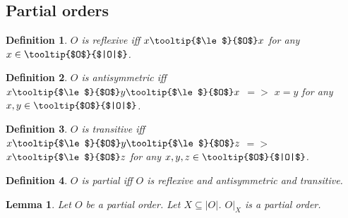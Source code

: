 \documentclass{article}
\newcommand{\rest}[2]{#1 \vert_{#2}}
\newcommand{\oO}[1]{\mbox{\tooltip{$\le$}{$#1$}}}
\newcommand{\oBC}[1]{\vert #1 \vert}
\newcommand{\oB}[1]{\mbox{\tooltip{$#1$}{$|#1|$}}}
\newtheorem*{definition}{Definition}
\newtheorem{lemma}{Lemma}
\begin{document}
\subsection{Partial orders}
\begin{forthel}
	\begin{definition}
		$O$ is reflexive iff $x \oO{O} x$ for any $x \in \oB{O}$. 
	\end{definition}
	
	\begin{definition}
		$O$ is antisymmetric iff \\
		$x \oO{O} y \oO{O} x$  $=>$  $x =y$  for any $x,y \in \oB{O}$. 
	\end{definition}
	\begin{definition}
		$O$ is transitive iff \\
		$x \oO{O} y \oO{O} z$  $=>$  $x \oO{O} z$ for any $x,y,z \in \oB{O}$. 
	\end{definition}
	\begin{definition}
		$O$ is partial iff $O$ is reflexive and antisymmetric and transitive.
	\end{definition}
	\begin{lemma}
		Let $O$ be a partial order. Let $X \subseteq \oBC{O}$. $\rest{O}{X}$ is a partial order.
	\end{lemma}
\end{forthel}
\end{document}
